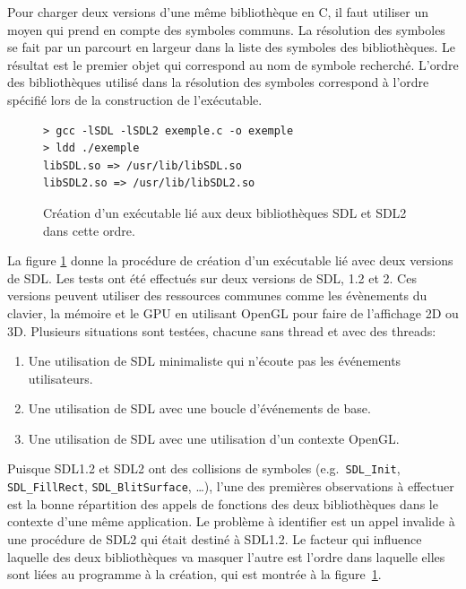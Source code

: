Pour charger deux versions d'une même bibliothèque en C, il faut utiliser un
moyen qui prend en compte des symboles communs.  La résolution des symboles se
fait par un parcourt en largeur dans la liste des symboles des bibliothèques.
Le résultat est le premier objet qui correspond au nom de symbole recherché.
L'ordre des bibliothèques utilisé dans la résolution des symboles correspond à
l'ordre spécifié lors de la construction de l'exécutable.

\begin{center}
\begin{figure}[ht]
\begin{lstlisting}[frame=single]
> gcc -lSDL -lSDL2 exemple.c -o exemple
> ldd ./exemple
libSDL.so => /usr/lib/libSDL.so
libSDL2.so => /usr/lib/libSDL2.so
\end{lstlisting}
\caption{Création d'un exécutable lié aux deux bibliothèques
SDL et SDL2 dans cette ordre.}
\label{fig:sdl_mask_sdl2}
\end{figure}
\end{center}

La figure \ref{fig:sdl_mask_sdl2} donne la procédure de création d'un
exécutable lié avec deux versions de SDL.  Les tests ont été effectués sur deux
versions de SDL, 1.2 et 2. Ces versions peuvent utiliser des ressources communes comme
les évènements du clavier, la mémoire et le GPU en utilisant OpenGL pour faire
de l'affichage 2D ou 3D.  Plusieurs situations sont testées, chacune sans thread
et avec des threads:
%
\begin{enumerate}
    \item Une utilisation de SDL minimaliste qui n'écoute pas les événements utilisateurs.
    \item Une utilisation de SDL avec une boucle d'événements de base.
    \item Une utilisation de SDL avec une utilisation d'un contexte OpenGL.
\end{enumerate}

Puisque SDL1.2 et SDL2 ont des collisions de symboles (e.g.\ \verb+SDL_Init+,
\verb+SDL_FillRect+, \verb+SDL_BlitSurface+, \dots), l'une des premières
observations à effectuer est la bonne répartition des appels de fonctions des
deux bibliothèques dans le contexte d'une même application. Le problème à
identifier est un appel invalide à une procédure de SDL2 qui était destiné à
SDL1.2. Le facteur qui influence laquelle des deux bibliothèques va masquer
l'autre est l'ordre dans laquelle elles sont liées au programme à la création,
qui est montrée à la figure~\ref{fig:sdl_mask_sdl2}.

